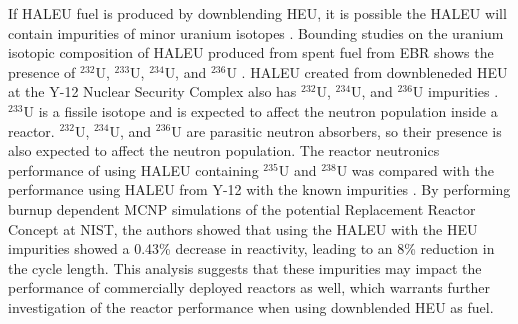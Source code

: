 If \gls{HALEU} fuel is produced by downblending \gls{HEU}, it is possible 
the \gls{HALEU} will contain impurities of minor uranium 
isotopes \cite{nuclear_energy_institute_establishing_2022}. Bounding studies on the 
uranium 
isotopic composition of \gls{HALEU} produced from spent fuel from \gls{EBR} 
shows the presence of $^{232}$U, $^{233}$U, $^{234}$U, and $^{236}$U
\cite{vaden_isotopic_2018}. 
\gls{HALEU} created from downbleneded \gls{HEU} at the Y-12 Nuclear Security 
Complex also has $^{232}$U, $^{234}$U, and $^{236}$U impurities
\cite{nelson_foreign_2010}. $^{233}$U is a fissile 
isotope and is expected to affect the neutron population inside a reactor.
$^{232}$U, $^{234}$U, and $^{236}$U are parasitic neutron absorbers, so 
their presence is also expected to affect the neutron population. The 
reactor neutronics performance of using \gls{HALEU} containing $^{235}$U 
and $^{238}$U was compared 
with the performance using \gls{HALEU} from Y-12 with the known impurities 
\cite{celikten_effects_2021}. By performing burnup dependent \gls{MCNP} 
simulations of the potential Replacement Reactor Concept at \gls{NIST}, 
the authors showed that using the \gls{HALEU} with the \gls{HEU} 
impurities showed a 0.43\% decrease in reactivity, leading to an 8\% reduction 
in the cycle length. This analysis suggests that these impurities may 
impact the performance of commercially deployed reactors as well, which 
warrants further investigation of the reactor performance when using 
downblended \gls{HEU} as fuel. 